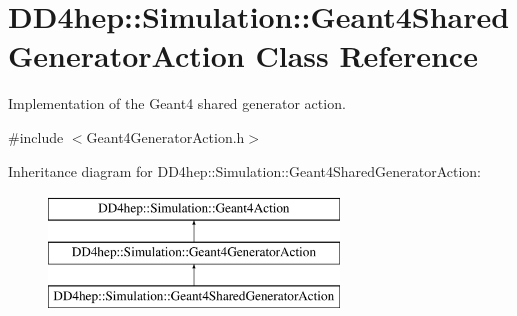 \hypertarget{class_d_d4hep_1_1_simulation_1_1_geant4_shared_generator_action}{}\section{D\+D4hep\+:\+:Simulation\+:\+:Geant4\+Shared\+Generator\+Action Class Reference}
\label{class_d_d4hep_1_1_simulation_1_1_geant4_shared_generator_action}


Implementation of the Geant4 shared generator action.  




{\ttfamily \#include $<$Geant4\+Generator\+Action.\+h$>$}

Inheritance diagram for D\+D4hep\+:\+:Simulation\+:\+:Geant4\+Shared\+Generator\+Action\+:\begin{figure}[H]
\begin{center}
\leavevmode
\includegraphics[height=3.000000cm]{class_d_d4hep_1_1_simulation_1_1_geant4_shared_generator_action}
\end{center}
\end{figure}
